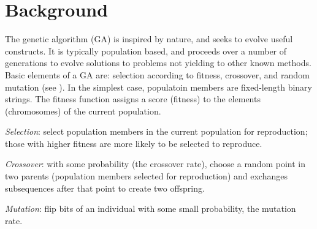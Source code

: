 \section{Background}
The genetic algorithm (GA) is inspired by nature, and seeks to evolve useful constructs. It is typically population based, and 
proceeds over a number of generations to evolve solutions to problems not yielding to other known methods. 
Basic elements of a GA are: 
selection according to fitness, crossover, and random mutation (see \cite{Mitchell1999}). 
In the simplest case, populatoin members are fixed-length binary strings.   
The fitness function assigns a score (fitness) to the elements (chromosomes) of 
the current population. 

\textit{Selection}: select population members in the current population for reproduction; 
those with higher fitness are more likely to be selected to reproduce.

\textit{Crossover}: with some probability (the crossover rate), choose a random point in two parents (population members selected for reproduction) 
and exchanges subsequences after that point to create two offspring.

\textit{Mutation}: flip bits of an individual with some small probability, 
the mutation rate.

